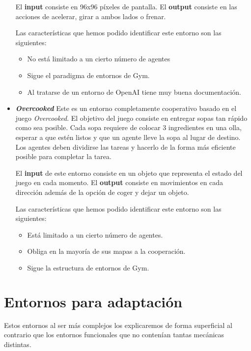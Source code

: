 \begin{itemize}
	      El \textbf{input} consiste en 96x96 píxeles de pantalla. El \textbf{output} consiste en las acciones de acelerar, girar a ambos lados o frenar.

	      Las características que hemos podido identificar este entorno son las siguientes:
	      \begin{itemize}
		      \item No está limitado a un cierto número de agentes
		      \item Sigue el paradigma de entornos de Gym.
		      \item Al tratarse de un entorno de OpenAI tiene muy buena documentación.
	      \end{itemize}
            
    \item \textbf{\textit{Overcooked}} \cite {overcooked} Este es un entorno completamente cooperativo basado en el juego \textit{Overcooked}. El objetivo del juego consiste en entregar sopas tan rápido como sea posible. Cada sopa requiere de colocar 3 ingredientes en una olla, esperar a que estén listos y que un agente lleve la sopa al lugar de destino. Los agentes deben dividirse las tareas y hacerlo de la forma más eficiente posible para completar la tarea.
    
    El \textbf{input} de este entorno consiste en un objeto que representa el estado del juego en cada momento. El \textbf{output} consiste en movimientos en cada dirección además de la opción de coger y dejar un objeto.

    Las características que hemos podido identificar este entorno son las siguientes:
	      \begin{itemize}
		      \item Está limitado a un cierto número de agentes.
		      \item Obliga en la mayoría de sus mapas a la cooperación.
		      \item Sigue la estructura de entornos de Gym.
	      \end{itemize}

\end{itemize}

\section{Entornos para adaptación}

Estos entornos al ser más complejos los explicaremos de forma superficial al contrario que los entornos funcionales que no contenían tantas mecánicas distintas.

